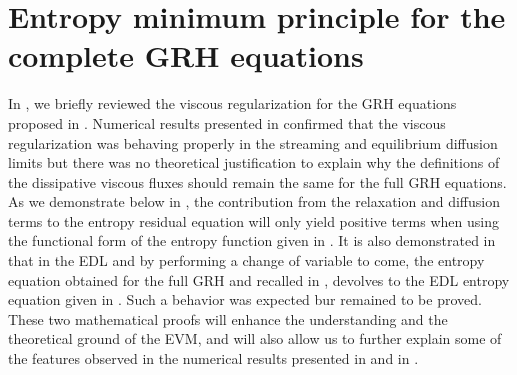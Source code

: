 \documentclass[times,doublespace]{fldauth}%
\begin{document}
%
\section{Entropy minimum principle for the complete GRH equations}
\label{sec:VR_new}
%
In , we briefly reviewed the viscous regularization for the GRH 
equations proposed in \cite{our_jcp_radhy_paper}. Numerical results presented in \cite{our_jcp_radhy_paper} confirmed that the viscous regularization 
was behaving properly in the streaming and equilibrium diffusion limits but there was no theoretical justification to 
explain why the definitions of the dissipative viscous fluxes should remain the same for the full GRH equations. As we 
demonstrate below in , the contribution from the relaxation and diffusion terms to the entropy residual equation will only 
yield positive terms when using the functional form of the entropy function given in . It is also demonstrated in  that in the EDL and by performing a change of variable to come, the entropy equation obtained for the full GRH and recalled in , devolves to the EDL entropy equation given in . Such a behavior was expected bur remained to be proved. These two mathematical proofs will enhance the understanding and the theoretical ground of the EVM, and will also allow us to further explain some of the features observed in the numerical results presented in  and in \cite{our_jcp_radhy_paper}. \\
%
\end{document}
